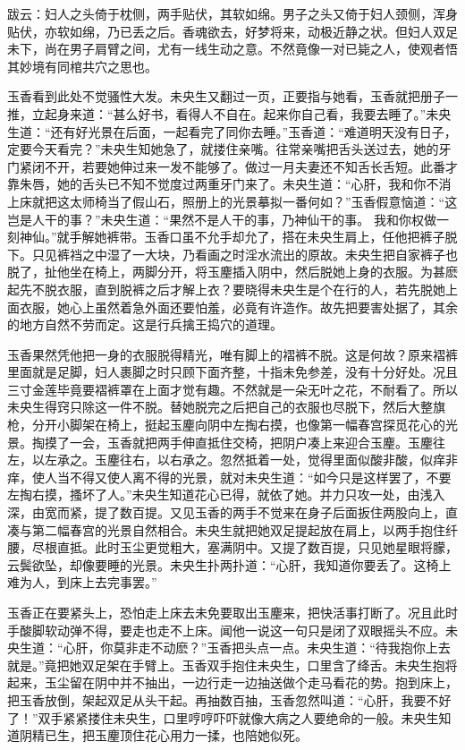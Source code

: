 \documentclass[a4paper,12pt,UTF8,twoside]{ctexbook}
\begin{document}
跋云：妇人之头倚于枕侧，两手贴伏，其软如绵。男子之头又倚于妇人颈侧，浑身贴伏，亦软如绵，乃已丢之后。香魂欲去，好梦将来，动极近静之状。但妇人双足未下，尚在男子肩臂之间，尤有一线生动之意。不然竟像一对已毙之人，使观者悟其妙境有同棺共穴之思也。

玉香看到此处不觉骚性大发。未央生又翻过一页，正要指与她看，玉香就把册子一推，立起身来道：“甚么好书，看得人不自在。起来你自己看，我要去睡了。”未央生道：“还有好光景在后面，一起看完了同你去睡。”玉香道：“难道明天没有日子，定要今天看完？”未央生知她急了，就搂住亲嘴。往常亲嘴把舌头送过去，她的牙门紧闭不开，若要她伸过来一发不能够了。做过一月夫妻还不知舌长舌短。此番才靠朱唇，她的舌头已不知不觉度过两重牙门来了。未央生道：“心肝，我和你不消上床就把这太师椅当了假山石，照册上的光景摹拟一番何如？”玉香假意恼道：“这岂是人干的事？”未央生道：“果然不是人干的事，乃神仙干的事。 我和你权做一刻神仙。”就手解她裤带。玉香口虽不允手却允了，搭在未央生肩上，任他把裤子脱下。只见裤裆之中湿了一大块，乃看画之时淫水流出的原故。未央生把自家裤子也脱了，扯他坐在椅上，两脚分开，将玉麈插入阴中，然后脱她上身的衣服。为甚麽起先不脱衣服，直到脱裤之后才解上衣？要晓得未央生是个在行的人，若先脱她上面衣服，她心上虽然着急外面还要怕羞，必竟有许造作。故先把要害处据了，其余的地方自然不劳而定。这是行兵擒王捣穴的道理。

玉香果然凭他把一身的衣服脱得精光，唯有脚上的褶裤不脱。这是何故？原来褶裤里面就是足脚，妇人裹脚之时只顾下面齐整，十指未免参差，没有十分好处。况且三寸金莲毕竟要褶裤罩在上面才觉有趣。不然就是一朵无叶之花，不耐看了。所以未央生得窍只除这一件不脱。替她脱完之后把自己的衣服也尽脱下，然后大整旗枪，分开小脚架在椅上，挺起玉麈向阴中左掏右摸，也像第一幅春宫探觅花心的光景。掏摸了一会，玉香就把两手伸直抵住交椅，把阴户凑上来迎合玉麈。玉麈往左，以左承之。玉麈往右，以右承之。忽然抵着一处，觉得里面似酸非酸，似痒非痒，使人当不得又使人离不得的光景，就对未央生道：“如今只是这样罢了，不要左掏右摸，搔坏了人。”未央生知道花心已得，就依了她。并力只攻一处，由浅入深，由宽而紧，提了数百提。又见玉香的两手不觉来在身子后面扳住两股向上，直凑与第二幅春宫的光景自然相合。未央生就把她双足提起放在肩上，以两手抱住纤腰，尽根直抵。此时玉尘更觉粗大，塞满阴中。又提了数百提，只见她星眼将朦，云鬓欲坠，却像要睡的光景。未央生扑两扑道：“心肝，我知道你要丢了。这椅上难为人，到床上去完事罢。”

玉香正在要紧头上，恐怕走上床去未免要取出玉麈来，把快活事打断了。况且此时手酸脚软动弹不得，要走也走不上床。闻他一说这一句只是闭了双眼摇头不应。未央生道：“心肝，你莫非走不动麽？”玉香把头点一点。未央生道：“待我抱你上去就是。”竟把她双足架在手臂上。玉香双手抱住未央生，口里含了绛舌。未央生抱将起来，玉尘留在阴中并不抽出，一边行走一边抽送做个走马看花的势。抱到床上，把玉香放倒，架起双足从头干起。再抽数百抽，玉香忽然叫道：“心肝，我要不好了！”双手紧紧搂住未央生，口里哼哼吓吓就像大病之人要绝命的一般。未央生知道阴精已生，把玉麈顶住花心用力一揉，也陪她似死。
\end{document}
